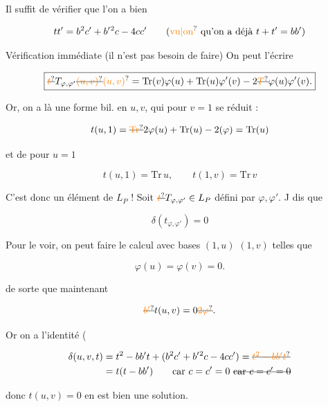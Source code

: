 
Il suffit de vérifier que l'on a bien

\[
tt'=b^2c'+b'{}^2c-4cc'\qquad\text{(\unsure{vu|on} qu'on a déjà }t+t'=bb'\text{)}
\]

Vérification immédiate (il n'est pas besoin de  faire)
On peut l'écrire

\[
\boxed{\deleted{\unsure{t}}T_{\varphi,\varphi'}\deleted{\unsure{(u,v)}}\unsure{(u,v)}=\mathrm{Tr}(v)\varphi(u)+\mathrm{Tr}(u)\varphi'(v)-2\deleted{\unsure{T}}\varphi(u)\varphi'(v).}
\]

Or, on a là une forme bil. en $u,v$,
qui pour $v=1$ se réduit :

\[
t(u,1)=\deleted{\unsure{\mathrm{Tr}}}2\varphi(u)+\mathrm{Tr}(u)-2(\varphi)=\mathrm{Tr}(u)
\]

et de  pour $u=1$ 

\[
t(u,1)=\mathrm{Tr}\,u,\qquad t(1,v)=\mathrm{Tr}\,v
\]

C'est donc un élément de $L_P$ ! Soit
$\deleted{\unsure{t}}T_{\varphi,\varphi'}\in L_P$
défini par $\varphi,\varphi'$. J dis que

\[
\delta(t_{\varphi,\varphi'})=0
\]

Pour le voir, on peut faire le calcul
avec bases  $(1,u)$ $(1,v)$ telles que

\[
\varphi(u)=\varphi(v)=0.
\]


de sorte que maintenant

\[
\deleted{\unsure{b'}}t(u,v)=0\deleted{\unsure{2\varphi}}.
\]

 Or on a l'identité (

\[
\begin{aligned}
\delta(u,v,t)&=t^2-bb't+(b^2c'+b'{}^2c-4cc')=\deleted{\unsure{t^2-bb't}}\\
&=t(t-bb')\qquad\text{car }c=c'=0\ \deleted{\text{car }c=c'=0}
\end{aligned}
\]

donc  $t(u,v)=0$ en est
bien une solution.


